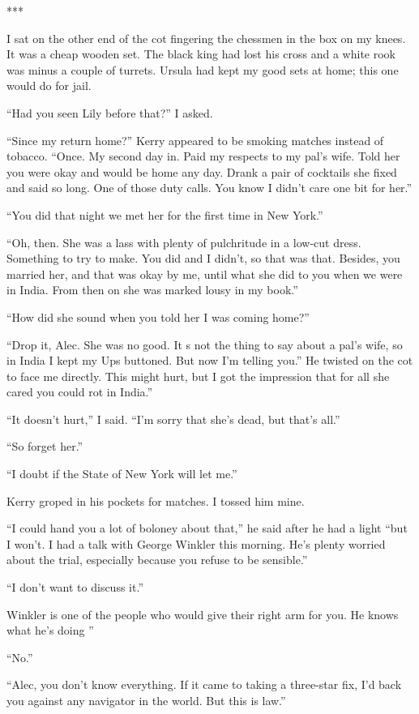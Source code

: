 \documentclass{novel}
\begin{document}
{***

I sat on the other end of the cot fingering the chessmen in the box on my knees. It was a cheap wooden set. The black king had lost his cross and a white rook was minus a couple of turrets. Ursula had kept my good sets at home; this one would do for jail.

“Had you seen Lily before that?” I asked.

“Since my return home?” Kerry appeared to be smoking matches instead of tobacco. “Once. My second day in. Paid my respects to my pal’s wife. Told her you were okay and would be home any day. Drank a pair of cocktails she fixed and said so long. One of those duty calls. You know I didn’t care one bit for her.”

“You did that night we met her for the first time in New York.”

“Oh, then. She was a lass with plenty of pulchritude in a low-cut dress. Something to try to make. You did and I didn’t, so that was that. Besides, you married her, and that was okay by me, until what she did to you when we were in India. From then on she was marked lousy in my book.”

“How did she sound when you told her I was coming home?”

“Drop it, Alec. She was no good. It s not the thing to say about a pal’s wife, so in India I kept my Ups buttoned. But now I’m telling you.” He twisted on the cot to face me directly. This might hurt, but I got the impression that for all she cared you could rot in India.”

“It doesn’t hurt,” I said. “I’m sorry that she’s dead, but that’s all.”

“So forget her.”

“I doubt if the State of New York will let me.”

Kerry groped in his pockets for matches. I tossed him mine.

“I could hand you a lot of boloney about that,” he said after he had a light “but I won’t. I had a talk with George Winkler this morning. He’s plenty worried about the trial, especially because you refuse to be sensible.”

“I don’t want to discuss it.”

Winkler is one of the people who would give their right arm for you. He knows what he’s doing ”

“No.”

“Alec, you don’t know everything. If it came to taking a three-star fix, I’d back you against any navigator in the world. But this is law.”

}
\end{document}
